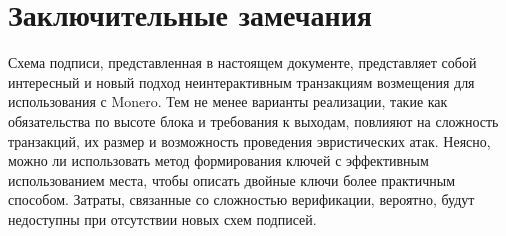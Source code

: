 \documentclass{mrl}
\begin{document}
\section{Заключительные замечания}
Схема подписи, представленная в настоящем документе, представляет собой интересный и новый подход неинтерактивным транзакциям возмещения для использования с Monero. Тем не менее вариан\-ты реализации, такие как обязательства по высоте блока и требования к выходам, повлияют на сложность транзакций, их размер и возможность проведения эвристических атак. Неясно, можно ли использовать метод формирования ключей с эффективным использованием места, чтобы описать двойные ключи более практичным способом. Затраты, связанные со сложностью верификации, вероят\-но, будут недоступны при отсутствии новых схем подписей.



\end{document}
